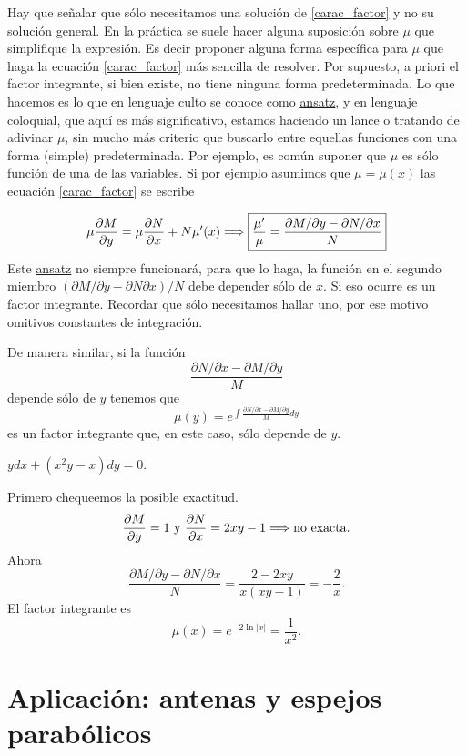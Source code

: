 Hay que señalar que sólo necesitamos una solución de \eqref{carac_factor} y no su solución general. En la práctica se suele hacer alguna suposición
sobre $\mu$ que simplifique la expresión. Es decir proponer alguna forma específica para $\mu$ que haga la ecuación \eqref{carac_factor} más sencilla de resolver. Por supuesto, a priori el factor integrante, si bien existe, no tiene ninguna forma predeterminada. Lo que hacemos es lo que en lenguaje culto se conoce como \href{http://es.wikipedia.org/wiki/Ansatz}{ansatz}\link, y en lenguaje coloquial, que aquí es más significativo, estamos haciendo un lance o tratando de adivinar $\mu$, sin mucho más criterio que buscarlo entre equellas funciones con una forma (simple) predeterminada. Por ejemplo, es común suponer que $\mu$ es sólo función de una de las variables. Si por ejemplo asumimos que $\mu=\mu(x)$ las ecuación
\eqref{carac_factor} se escribe

\[\mu\der{M}{y}=\mu\der{N}{x}+N\mu'(x) \Longrightarrow\boxed{\frac{\mu'}{\mu}=\frac{\partial M/\partial y-\partial N/\partial x}{N}}\]
Este \href{http://es.wikipedia.org/wiki/Ansatz}{ansatz} no siempre funcionará,
para que lo haga,  la función en el segundo miembro $(\partial M/\partial
y-\partial N\partial x)/N$
debe depender sólo de $x$. Si eso ocurre
es un factor integrante. Recordar que sólo necesitamos hallar uno, por ese motivo omitivos constantes de integración.

De manera similar, si la función
\[\frac{\partial N/\partial x-\partial M/\partial y}{M}\]
depende sólo de $y$ tenemos que
\[\mu(y)=e^{\int \frac{\partial N/\partial x-\partial M/\partial y}{M}dy}\]
es un factor integrante que, en este caso, sólo depende de $y$.

\begin{ejemplo} $ydx+(x^2y-x)dy=0$.
 \end{ejemplo}


Primero chequeemos la posible exactitud.
\[\der{M}{y}=1\text{ y } \der{N}{x}=2xy-1\Longrightarrow\text{no exacta}.\]
Ahora
\[\frac{\partial M/\partial y-\partial N/\partial x}{N}=\frac{2-2xy}{x(xy-1)}=-\frac{2}{x}.\]
El factor integrante es
\[\mu(x)=e^{-2\ln |x|}=\frac{1}{x^2}.\]





\section{Aplicación: antenas y espejos parabólicos}

